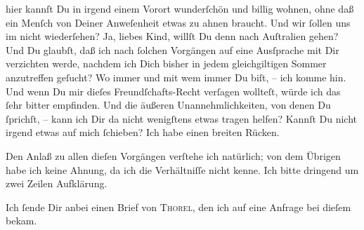                hier kannſt Du in irgend einem Vorort wunderſchön und billig wohnen, ohne daß ein
               Menſch von Deiner Anweſenheit etwas zu ahnen braucht. Und wir{ }ſollen uns im \label{K_L02802-3v}\label{K_L02802-3} nicht wiederſehen? Ja,
               liebes Kind, willſt Du denn nach Auſtralien
               gehen? Und Du glaubſt, daß ich {\pb}nach{ }ſolchen
               Vorgängen auf eine Ausſprache mit Dir verzichten werde, nachdem ich Dich bisher in
               jedem gleichgiltigen Sommer anzutreffen geſucht? Wo immer und mit wem immer Du biſt,
               – ich komme hin. Und wenn Du mir dieſes Freundſchafts-Recht verſagen wollteſt, würde
               ich das{ }ſehr bitter empfinden. Und die äußeren Unannehmlichkeiten, von denen Du{ }ſprichſt, – kann ich Dir da nicht wenigſtens etwas tragen helfen? Kannſt Du nicht
               irgend etwas auf mich{ }ſchieben? Ich habe einen breiten Rücken.\pend
           
\pstart
           {\pb}Den Anlaß zu allen dieſen Vorgängen verſtehe ich
               natürlich; von dem Übrigen habe ich keine Ahnung, da ich die Verhältniſſe nicht
               kenne. Ich bitte dringend um zwei Zeilen Aufklärung.\pend
           
\pstart
           Ich{ }ſende Dir anbei einen Brief von \textsc{Thorel}, den ich auf eine Anfrage bei dieſem bekam.\pend
           
